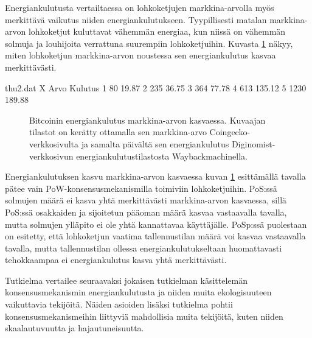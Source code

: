 \vspace{1cm}


Energiankulutusta vertailtaessa on lohkoketjujen markkina-arvolla myös merkittävä vaikutus niiden energiankulutukseen. Tyypillisesti matalan markkina-arvon lohkoketjut kuluttavat vähemmän energiaa, kun niissä on vähemmän solmuja ja louhijoita verrattuna suurempiin lohkoketjuihin. Kuvasta \ref{fig_energy} näkyy, miten lohkoketjun markkina-arvon noustessa sen energiankulutus kasvaa merkittävästi.

\begin{filecontents}{thu2.dat}
X Arvo  	Kulutus
1 80	    19.87 %
2 235	    36.75 %
3 364	    77.78 %
4 613	    135.12 %
5 1230  	189.88 %
\end{filecontents}

\begin{figure}[h!]
\centering
{}
\caption{Bitcoinin energiankulutus markkina-arvon kasvaessa. Kuvaajan tilastot on kerätty ottamalla sen markkina-arvo Coingecko-verkkosivulta ja samalta päivältä sen energiankulutus Diginomist-verkkosivun energiankulutustilastosta Waybackmachinella.}
\label{fig_energy}
\end{figure}

Energiankulutuksen kasvu markkina-arvon kasvaessa kuvan \ref{fig_energy} esittämällä tavalla pätee vain PoW-konsensusmekanismilla toimiviin lohkoketjuihin. PoS:ssä solmujen määrä ei kasva yhtä merkittävästi markkina-arvon kasvaessa, sillä PoS:ssä osakkaiden ja sijoitetun pääoman määrä kasvaa vastaavalla tavalla, mutta solmujen ylläpito ei ole yhtä kannattavaa käyttäjälle. PoSp:ssä puolestaan on esitetty, että lohkoketjun vaatima tallennustilan määrä voi kasvaa vastaavalla tavalla, mutta tallennustilan ollessa energiankulutukseltaan huomattavasti tehokkaampaa ei energiankulutus kasva yhtä merkittävästi.

Tutkielma vertailee seuraavaksi jokaisen tutkielman käsittelemän konsensusmekanismin energiankulutusta ja niiden muita ekologisuuteen vaikuttavia tekijöitä. Näiden asioiden lisäksi tutkielma pohtii konsensusmekanismeihin liittyviä mahdollisia muita tekijöitä, kuten niiden skaalautuvuutta ja hajautuneisuutta.




